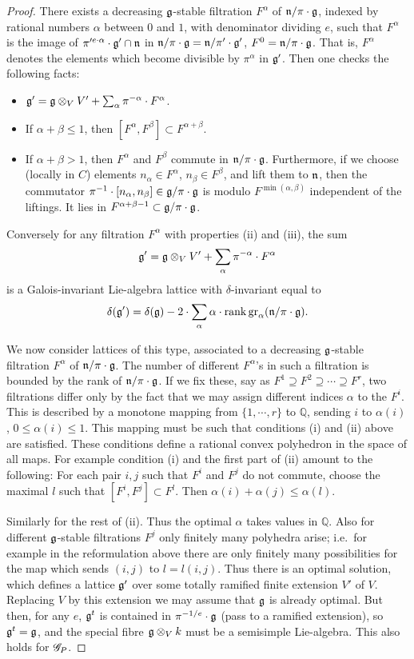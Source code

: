 \documentclass[12pt,english]{smfart}
\theoremstyle{plain} \newtheorem{innerthm}{Theorem} \newtheorem{innerlem}{Lemma} \newtheorem{innerprop}{Proposition} \newtheorem{innercor}{Corollary} \theoremstyle{definition} \newtheorem{innerdefn}{Definition} \newtheorem{innerconstr}{Construction} \theoremstyle{remark} \newtheorem*{remark}{Remark} \newtheorem*{remarks}{Remarks} \newtheorem*{applications}{Applications}
\begin{document}
\begin{proof}
There exists a decreasing $\mathfrak{g}$-stable filtration $F^\alpha$ of $\mathfrak{n}/\pi\cdot\mathfrak{g}$, indexed by rational numbers $\alpha$ between $0$ and $1$, with denominator dividing $e$, such
that $F^\alpha$ is the image of $\pi'^{e\cdot\alpha}\cdot\mathfrak{g}'\cap\mathfrak{n}$ in $\mathfrak{n}/\pi\cdot\mathfrak{g}=\mathfrak{n}/\pi'\cdot\mathfrak{g}'$, $F^0=\mathfrak{n}/\pi\cdot\mathfrak{g}$. That is, $F^\alpha$ denotes the elements which become divisible by $\pi^\alpha$ in $\mathfrak{g}'$. Then one checks the following facts:
\begin{itemize}
\item[(i)] $\mathfrak{g}'=\mathfrak{g}\otimes_V V'+\sum_\alpha \pi^{-\alpha}\cdot F^\alpha$.
\item[(ii)] If $\alpha+\beta\le 1$, then $[F^\alpha,F^\beta]\subset F^{\alpha+\beta}$.
\item[(iii)] If $\alpha+\beta>1$, then $F^\alpha$ and $F^\beta$ commute in
$\mathfrak{n}/\pi\cdot\mathfrak{g}$. Furthermore, if we choose (locally in $C$) elements $n_\alpha\in F^\alpha$, $n_\beta\in F^\beta$, and lift them to $\mathfrak{n}$, then the commutator $\pi^{-1}\cdot[n_\alpha,n_\beta]\in\mathfrak{g}/\pi\cdot\mathfrak{g}$ is modulo $F^{\min(\alpha,\beta)}$ independent of the liftings. It lies in $F^{\alpha+\beta-1}\subset\mathfrak{g}/\pi\cdot\mathfrak{g}$.
\end{itemize}

Conversely for any filtration $F^\alpha$ with properties (ii) and (iii), the sum
\[
\mathfrak{g}'=\mathfrak{g}\otimes_V V'+\sum_\alpha \pi^{-\alpha}\cdot F^\alpha
\]
is a Galois-invariant Lie-algebra lattice with $\delta$-invariant equal to
\[
\delta(\mathfrak{g}')=\delta(\mathfrak{g})-2\cdot\sum_\alpha \alpha\cdot\operatorname{rank}\operatorname{gr}_\alpha(\mathfrak{n}/\pi\cdot\mathfrak{g}).
\]

We now consider lattices of this type, associated to a decreasing $\mathfrak{g}$-stable filtration $F^\alpha$ of $\mathfrak{n}/\pi\cdot\mathfrak{g}$. The number of different $F^\alpha$'s in such a filtration is bounded by the rank of $\mathfrak{n}/\pi\cdot\mathfrak{g}$. If we fix these, say as $F^1\supseteq F^2\supseteq\cdots\supseteq F^r$, two filtrations differ only by the fact that we may assign different indices $\alpha$ to the $F^i$. This is described by a monotone mapping from $\{1,\cdots,r\}$ to $\mathbb{Q}$, sending $i$ to $\alpha(i)$, $0\le\alpha(i)\le 1$. This mapping must be such that conditions (i) and (ii) above are satisfied. These conditions define a rational convex polyhedron in the space of all maps. For example condition (i) and the first part of (ii) amount to the following: For each pair $i,j$ such that $F^i$ and $F^j$ do not commute, choose the maximal $l$ such that $[F^i,F^j]\subset F^l$. Then $\alpha(i)+\alpha(j)\le\alpha(l)$.

Similarly for the rest of (ii). Thus the optimal $\alpha$ takes values in $\mathbb{Q}$. Also for different $\mathfrak{g}$-stable filtrations $F^j$ only finitely many polyhedra arise; i.e.\ for example in the reformulation above there are only finitely many possibilities for the map which sends $(i,j)$ to $l=l(i,j)$. Thus there is an optimal solution, which defines a lattice $\mathfrak{g}'$ over some totally ramified finite extension $V'$ of $V$. Replacing $V$ by this extension we may assume that $\mathfrak{g}$ is already optimal. But then, for any $e$, $\mathfrak{g}^t$ is contained in $\pi^{-1/e}\cdot\mathfrak{g}$ (pass to a ramified extension), so $\mathfrak{g}^t=\mathfrak{g}$, and the special fibre $\mathfrak{g}\otimes_V k$ must be a semisimple Lie-algebra. This also holds for $\mathscr{G}_P$.


\end{proof}
\end{document}
